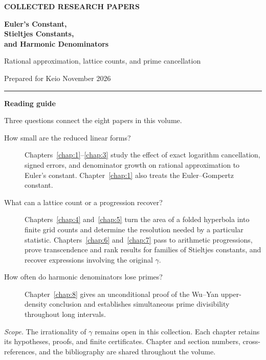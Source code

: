 \documentclass[11pt,a4paper,oneside,openany]{report}
\theoremstyle{remark}\newtheorem{remark}[theorem]{Remark}
\numberwithin{equation}{section}
\begin{document}
\thispagestyle{empty}
\vspace*{18mm}
{\noindent\small\sffamily\bfseries\color{ink} COLLECTED RESEARCH PAPERS\par}
\vspace{6mm}
{\noindent\raggedright\fontsize{28}{34}\selectfont\bfseries\color{ink}
Euler's Constant,\\[2pt] Stieltjes Constants,\\[2pt] and Harmonic Denominators\par}
\vspace{4mm}
{\noindent\large Rational approximation, lattice counts, and prime cancellation\par}
\vspace{7mm}
{\noindent Prepared for Keio\quad\textperiodcentered{} November 2026\par}
\vspace{11mm}
\noindent\rule{\textwidth}{.5pt}\par\vspace{2mm}
\noindent\textbf{Reading guide}\par\smallskip
\noindent Three questions connect the eight papers in this volume.
\begin{description}
\item[How small are the reduced linear forms?] Chapters~\ref{chap:1}--\ref{chap:3} study the effect of exact logarithm cancellation, signed errors, and denominator growth on rational approximation to Euler's constant. Chapter~\ref{chap:1} also treats the Euler--Gompertz constant.
\item[What can a lattice count or a progression recover?] Chapters~\ref{chap:4} and~\ref{chap:5} turn the area of a folded hyperbola into finite grid counts and determine the resolution needed by a particular statistic. Chapters~\ref{chap:6} and~\ref{chap:7} pass to arithmetic progressions, prove transcendence and rank results for families of Stieltjes constants, and recover expressions involving the original $\gamma$.
\item[How often do harmonic denominators lose primes?] Chapter~\ref{chap:8} gives an unconditional proof of the Wu--Yan upper-density conclusion and establishes simultaneous prime divisibility throughout long intervals.
\end{description}
\vfill
\noindent\textit{Scope.} The irrationality of $\gamma$ remains open in this collection. Each chapter retains its hypotheses, proofs, and finite certificates. Chapter and section numbers, cross-references, and the bibliography are shared throughout the volume.
\clearpage
{}
\tableofcontents\clearpage
{}
\end{document}
